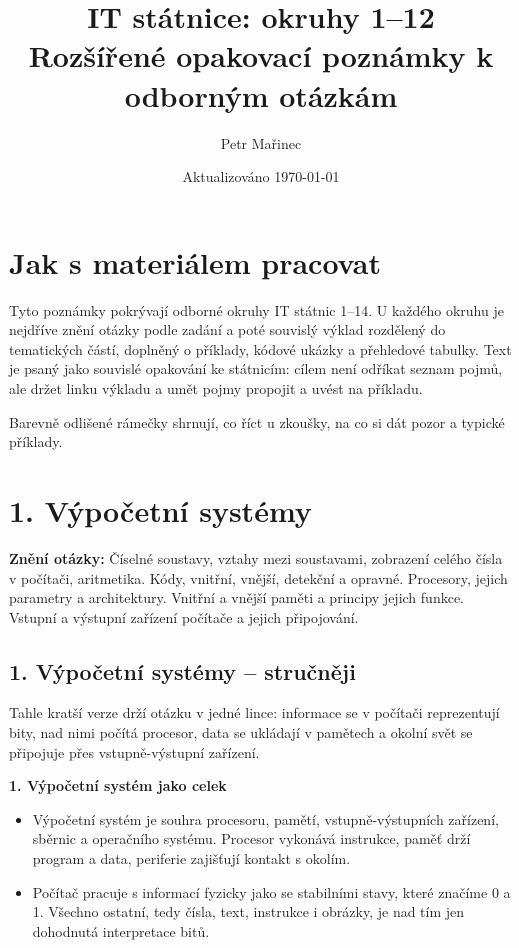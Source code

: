 \documentclass[11pt,a4paper]{article}
\title{IT státnice: okruhy 1--12\\\large Rozšířené opakovací poznámky k odborným otázkám}
\author{Petr Mařinec}
\date{Aktualizováno \today}
\newcommand{\otazka}[3]{\section*{#1}\addcontentsline{toc}{section}{#1}\noindent\textbf{Znění otázky:} #2\par\medskip}
\begin{document}
\maketitle
\tableofcontents
\newpage

\section*{Jak s materiálem pracovat}
Tyto poznámky pokrývají odborné okruhy IT státnic 1--14. U každého okruhu je nejdříve znění otázky podle zadání a poté souvislý výklad rozdělený do tematických částí, doplněný o příklady, kódové ukázky a přehledové tabulky. Text je psaný jako souvislé opakování ke státnicím: cílem není odříkat seznam pojmů, ale držet linku výkladu a umět pojmy propojit a uvést na příkladu.

Barevně odlišené rámečky shrnují, co říct u zkoušky, na co si dát pozor a typické příklady.


\otazka{1. Výpočetní systémy}{Číselné soustavy, vztahy mezi soustavami, zobrazení celého čísla v počítači, aritmetika. Kódy, vnitřní, vnější, detekční a opravné. Procesory, jejich parametry a architektury. Vnitřní a vnější paměti a principy jejich funkce. Vstupní a výstupní zařízení počítače a jejich připojování.}{PB151}

\subsection*{1. Výpočetní systémy -- stručněji}
Tahle kratší verze drží otázku v jedné lince: informace se v počítači reprezentují bity, nad nimi počítá procesor, data se ukládají v pamětech a okolní svět se připojuje přes vstupně-výstupní zařízení.

\textbf{1. Výpočetní systém jako celek}
\begin{itemize}
  \item Výpočetní systém je souhra procesoru, pamětí, vstupně-výstupních zařízení, sběrnic a operačního systému. Procesor vykonává instrukce, paměť drží program a data, periferie zajišťují kontakt s okolím.
  \item Počítač pracuje s informací fyzicky jako se stabilními stavy, které značíme 0 a 1. Všechno ostatní, tedy čísla, text, instrukce i obrázky, je nad tím jen dohodnutá interpretace bitů.
\end{itemize}
\end{document}
